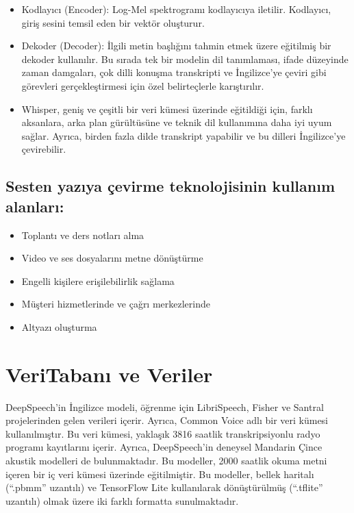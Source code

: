 \documentclass{article}
\begin{document}
\begin{itemize}
		\item Kodlayıcı (Encoder): Log-Mel spektrogramı kodlayıcıya iletilir. Kodlayıcı, giriş sesini temsil eden bir vektör oluşturur.
		\item Dekoder (Decoder): İlgili metin başlığını tahmin etmek üzere eğitilmiş bir dekoder kullanılır. Bu sırada tek bir modelin dil tanımlaması, ifade düzeyinde zaman damgaları, çok dilli konuşma transkripti ve İngilizce’ye çeviri gibi görevleri gerçekleştirmesi için özel belirteçlerle karıştırılır.
		\item Whisper, geniş ve çeşitli bir veri kümesi üzerinde eğitildiği için, farklı aksanlara, arka plan gürültüsüne ve teknik dil kullanımına daha iyi uyum sağlar. Ayrıca, birden fazla dilde transkript yapabilir ve bu dilleri İngilizce’ye çevirebilir.
	\end{itemize}
	

	\subsection{Sesten yazıya çevirme teknolojisinin kullanım alanları:}
	\begin{itemize}
		\item Toplantı ve ders notları alma
		\item Video ve ses dosyalarını metne dönüştürme
		\item Engelli kişilere erişilebilirlik sağlama
		\item Müşteri hizmetlerinde ve çağrı merkezlerinde
		\item Altyazı oluşturma
	\end{itemize}
	
	
	
	\section{VeriTabanı ve Veriler}
	DeepSpeech’in İngilizce modeli, öğrenme için LibriSpeech, Fisher ve Santral projelerinden gelen verileri içerir. Ayrıca, Common Voice adlı bir veri kümesi kullanılmıştır. Bu veri kümesi, yaklaşık 3816 saatlik transkripsiyonlu radyo programı kayıtlarını içerir.
	Ayrıca, DeepSpeech’in deneysel Mandarin Çince akustik modelleri de bulunmaktadır. Bu modeller, 2000 saatlik okuma metni içeren bir iç veri kümesi üzerinde eğitilmiştir. Bu modeller, bellek haritalı (“.pbmm” uzantılı) ve TensorFlow Lite kullanılarak dönüştürülmüş (“.tflite” uzantılı) olmak üzere iki farklı formatta sunulmaktadır.\\
	
\end{document}
